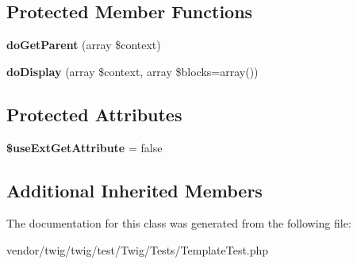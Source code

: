 \subsection*{Protected Member Functions}
\begin{DoxyCompactItemize}
\item 
{\bfseries do\+Get\+Parent} (array \$context)\hypertarget{classTwig__TemplateTest_aedcf3e2cf429374180de61aa17aaf30e}{}\label{classTwig__TemplateTest_aedcf3e2cf429374180de61aa17aaf30e}

\item 
{\bfseries do\+Display} (array \$context, array \$blocks=array())\hypertarget{classTwig__TemplateTest_aa7658d5e94bb8eeeb16fae749064cb95}{}\label{classTwig__TemplateTest_aa7658d5e94bb8eeeb16fae749064cb95}

\end{DoxyCompactItemize}
\subsection*{Protected Attributes}
\begin{DoxyCompactItemize}
\item 
{\bfseries \$use\+Ext\+Get\+Attribute} = false\hypertarget{classTwig__TemplateTest_a5a9468c55141fe89dac30ca063cd1515}{}\label{classTwig__TemplateTest_a5a9468c55141fe89dac30ca063cd1515}

\end{DoxyCompactItemize}
\subsection*{Additional Inherited Members}


The documentation for this class was generated from the following file\+:\begin{DoxyCompactItemize}
\item 
vendor/twig/twig/test/\+Twig/\+Tests/Template\+Test.\+php\end{DoxyCompactItemize}
